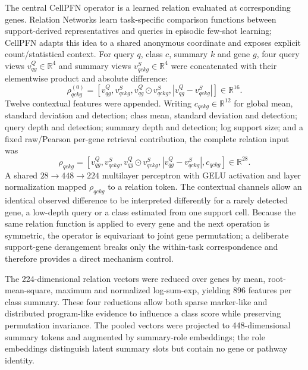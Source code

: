 \documentclass[12pt]{article}
\begin{document}
The central CellPFN operator is a learned relation evaluated at corresponding genes. Relation Networks learn task-specific comparison functions between support-derived representatives and queries in episodic few-shot learning\cite{sung2018relation}; CellPFN adapts this idea to a shared anonymous coordinate and exposes explicit count/statistical context. For query $q$, class $c$, summary $k$ and gene $g$, four query views $v^Q_{qg}\in\mathbb{R}^4$ and summary views $v^S_{qckg}\in\mathbb{R}^4$ were concatenated with their elementwise product and absolute difference:
\begin{equation}
\rho^{(0)}_{qckg}=\left[v^Q_{qg},v^S_{qckg},v^Q_{qg}\odot v^S_{qckg},|v^Q_{qg}-v^S_{qckg}|\right]\in\mathbb{R}^{16}.
\end{equation}
Twelve contextual features were appended. Writing $c_{qckg}\in\mathbb{R}^{12}$ for global mean, standard deviation and detection; class mean, standard deviation and detection; query depth and detection; summary depth and detection; log support size; and a fixed raw/Pearson per-gene retrieval contribution, the complete relation input was
\begin{equation}
 \rho_{qckg}=\left[v^Q_{qg},v^S_{qckg},v^Q_{qg}\odot v^S_{qckg},|v^Q_{qg}-v^S_{qckg}|,c_{qckg}\right]\in\mathbb{R}^{28}.
\end{equation}
A shared $28\rightarrow448\rightarrow224$ multilayer perceptron with GELU activation and layer normalization mapped $\rho_{qckg}$ to a relation token. The contextual channels allow an identical observed difference to be interpreted differently for a rarely detected gene, a low-depth query or a class estimated from one support cell. Because the same relation function is applied to every gene and the next operation is symmetric, the operator is equivariant to joint gene permutation; a deliberate support-gene derangement breaks only the within-task correspondence and therefore provides a direct mechanism control.

The 224-dimensional relation vectors were reduced over genes by mean, root-mean-square, maximum and normalized log-sum-exp, yielding 896 features per class summary. These four reductions allow both sparse marker-like and distributed program-like evidence to influence a class score while preserving permutation invariance\cite{zaheer2017deepsets,lee2019settransformer}. The pooled vectors were projected to 448-dimensional summary tokens and augmented by summary-role embeddings; the role embeddings distinguish latent summary slots but contain no gene or pathway identity.
\end{document}
